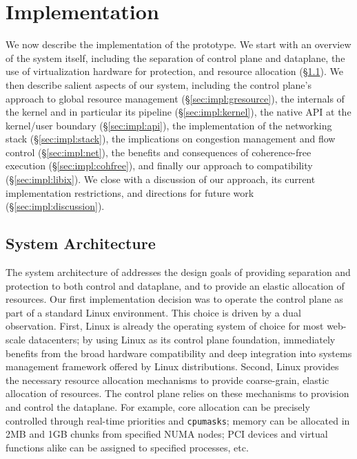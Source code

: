 
\section{Implementation}
\label{sec:impl}

We now describe the implementation of the \ix prototype.  We start
with an overview of the system itself, including the separation of
control plane and dataplane, the use of virtualization hardware for
protection, and resource allocation (\S\ref{sec:impl:overview}). We
then describe salient aspects of our system, including the control
plane's approach to global resource management
(\S\ref{sec:impl:gresource}), the internals of the \ix kernel and in
particular its pipeline (\S\ref{sec:impl:kernel}), the native API at
the kernel/user boundary (\S\ref{sec:impl:api}), the implementation of the networking stack (\S\ref{sec:impl:stack}), 
the implications on congestion management and flow control (\S\ref{sec:impl:net}), the benefits and consequences of coherence-free execution (\S\ref{sec:impl:cohfree}), and finally our approach to
compatibility (\S\ref{sec:impl:libix}).  We
close with a discussion of our approach, its current implementation
restrictions, and directions for future work
(\S\ref{sec:impl:discussion}).

\subsection{System Architecture}
\label{sec:impl:overview}



The system architecture of \ix addresses the design goals of providing
separation and protection to both control and dataplane, and to
provide an elastic allocation of resources.  Our first implementation
decision was to operate the control plane as part of a standard Linux
environment.  This choice is driven by a dual observation. First,
Linux is already the operating system of choice for most web-scale
datacenters; by using Linux as its control plane foundation, \ix
immediately benefits from the broad hardware compatibility and deep
integration into systems management framework offered by Linux
distributions. Second, Linux provides the necessary resource
allocation mechanisms to provide coarse-grain, elastic allocation of
resources.  The control plane relies on these mechanisms to
provision and control the dataplane.  For example, core allocation can
be precisely controlled through real-time priorities and
\texttt{cpumasks}; memory can be allocated in 2MB and 1GB chunks from
specified NUMA nodes; PCI devices and virtual functions alike can be
assigned to specified processes, etc.

